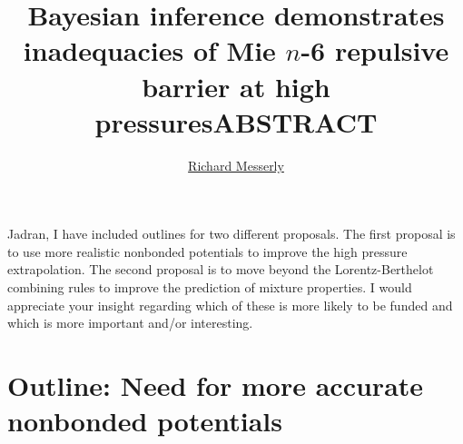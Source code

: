 \documentclass[11pt,a4paper]{article}
\begin{document}
	\thispagestyle{empty}
	\title{\Large \textbf{Bayesian inference demonstrates inadequacies of Mie $n$-6 repulsive barrier at high pressures}} %
	\author[1]{\large {\underline{Richard Messerly}}}%
	
	
	
	\date{} %
	\maketitle\thispagestyle{empty} %
	\begin{center}
		\title{\textbf{ABSTRACT}}\centering{}
	\end{center}
	\justify

Jadran, I have included outlines for two different proposals. The first proposal is to use more realistic nonbonded potentials to improve the high pressure extrapolation. The second proposal is to move beyond the Lorentz-Berthelot combining rules to improve the prediction of mixture properties. I would appreciate your insight regarding which of these is more likely to be funded and which is more important and/or interesting.

\section{Outline: Need for more accurate nonbonded potentials}
\end{document}
